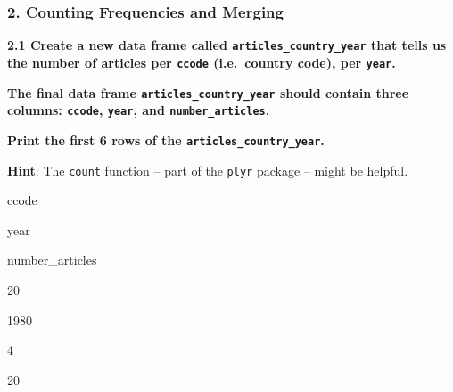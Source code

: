 \documentclass[]{book}
\newenvironment{Shaded}{\begin{snugshade}}{\end{snugshade}}
\newcommand{\CommentTok}[1]{\textcolor[rgb]{0.56,0.35,0.01}{\textit{#1}}}
\newcommand{\DataTypeTok}[1]{\textcolor[rgb]{0.13,0.29,0.53}{#1}}
\newcommand{\KeywordTok}[1]{\textcolor[rgb]{0.13,0.29,0.53}{\textbf{#1}}}
\newcommand{\NormalTok}[1]{#1}
\newcommand{\OperatorTok}[1]{\textcolor[rgb]{0.81,0.36,0.00}{\textbf{#1}}}
\newcommand{\StringTok}[1]{\textcolor[rgb]{0.31,0.60,0.02}{#1}}
\begin{document}
\begin{Shaded}
\end{Shaded}

\hypertarget{counting-frequencies-and-merging}{%
\subsubsection*{2. Counting Frequencies and Merging}\label{counting-frequencies-and-merging}}

\textbf{2.1 Create a new data frame called \texttt{articles\_country\_year} that tells us the number of articles per \texttt{ccode} (i.e.~country code), per \texttt{year}.}

\textbf{The final data frame \texttt{articles\_country\_year} should contain three columns: \texttt{ccode}, \texttt{year}, and \texttt{number\_articles}.}

\textbf{Print the first 6 rows of the \texttt{articles\_country\_year}.}

\textbf{Hint}: The \texttt{count} function -- part of the \texttt{plyr} package -- might be helpful.

\begin{Shaded}
\end{Shaded}

ccode

year

number\_articles

20

1980

4

20
\end{document}
